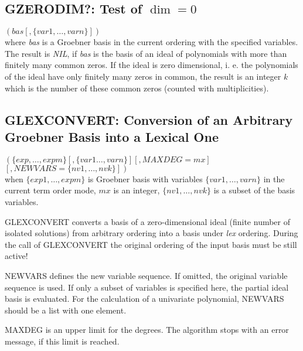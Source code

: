 \subsection{GZERODIM?: Test of $\dim = 0$}
\begin{description}
\item[{\it GZERODIM}!?] $\left(bas[,\{var1,\ldots , varn\}]\right)$ \\
where {\it bas} is a Groebner basis in the current ordering with the
specified variables. The result is {\it NIL}, if {\it bas} is the
basis of an ideal of polynomials with more than finitely many common zeros.
If the ideal is zero dimensional, i. e. the polynomials of the ideal have only
finitely many zeros in common, the result is an integer $k$ which is the number
of these common zeros (counted with multiplicities).
\end{description}

\subsection{GLEXCONVERT: Conversion of an Arbitrary Groebner Basis
into a Lexical One}
\begin{description}
\item[{\it GLEXCONVERT}] $ \left(\{exp,\ldots , expm\} \left[,\{var1
\ldots , varn\}\right]\left[,MAXDEG=mx\right]\right.$ \\
$\left.\left[,NEWVARS=\{nv1, \ldots , nvk\}\right]\right) $ \\
when $\{exp1, \ldots , expm\}$ is Groebner basis with variables
$\{var1, \ldots , varn\}$ in the current term order mode,
$mx$ is an integer,
$\{nv1, \ldots , nvk\}$ is a subset of the basis variables.
\end{description}

GLEXCONVERT converts a basis of a zero-dimensional ideal (finite number
of isolated solutions) from arbitrary ordering into a basis under {\it
lex} ordering. During the call of GLEXCONVERT the original ordering of
the input basis must be still active!

NEWVARS defines the new variable sequence. If omitted, the
original variable sequence is used. If only a subset of variables is
specified here, the partial ideal basis is evaluated. For the
calculation of a univariate polynomial, NEW\-VARS should be a list
with one element.

MAXDEG is an upper limit for the degrees. The algorithm stops with
an error message, if this limit is reached.

